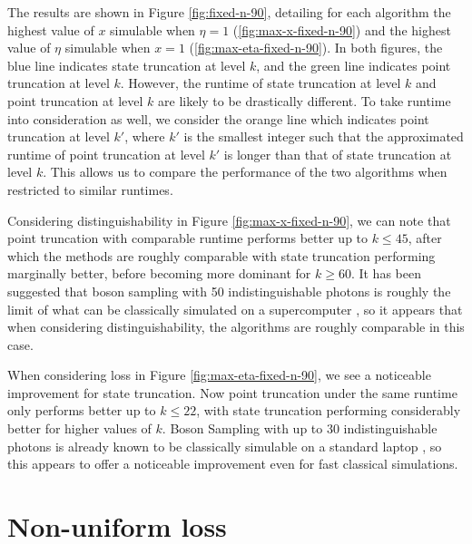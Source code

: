 The results are shown in Figure \ref{fig:fixed-n-90}, detailing for each algorithm the highest value of $x$ simulable when $\eta=1$ (\ref{fig:max-x-fixed-n-90}) and the highest value of $\eta$ simulable when $x=1$ (\ref{fig:max-eta-fixed-n-90}). 
In both figures, the blue line indicates state truncation at level $k$, and the green line indicates point truncation at level $k$. 
However, the runtime of state truncation at level $k$ and point truncation at level $k$ are likely to be drastically different. 
To take runtime into consideration as well, we consider the orange line which indicates point truncation at level $k'$, where $k'$ is the smallest integer such that the approximated runtime of point truncation at level $k'$ is longer than that of state truncation at level $k$. 
This allows us to compare the performance of the two algorithms when restricted to similar runtimes.

Considering distinguishability in Figure \ref{fig:max-x-fixed-n-90}, we can note that point truncation with comparable runtime performs better up to $k\leq 45$, after which the methods are roughly comparable with state truncation performing marginally better, before becoming more dominant for $k\geq 60$. 
It has been suggested that boson sampling with 50 indistinguishable photons is roughly the limit of what can be classically simulated on a supercomputer \cite{neville2017, clifford2017, zhang2018}, so it appears that when considering distinguishability, the algorithms are roughly comparable in this case.

When considering loss in Figure \ref{fig:max-eta-fixed-n-90}, we see a noticeable improvement for state truncation. 
Now point truncation under the same runtime only performs better up to $k\leq 22$, with state truncation performing considerably better for higher values of $k$. 
Boson Sampling with up to 30 indistinguishable photons is already known to be classically simulable on a standard laptop \cite{neville2017}, so this appears to offer a noticeable improvement even for fast classical simulations.



\section{Non-uniform loss}

